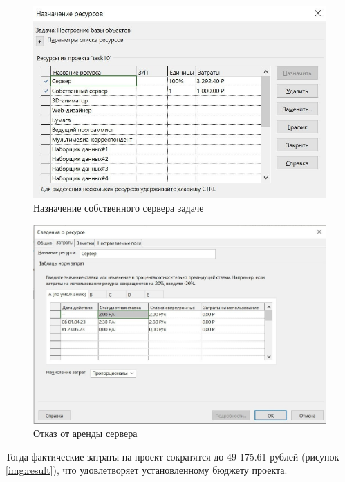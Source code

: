 \begin{figure}[H]
	\begin{center}
		\includegraphics[scale=0.3]{inc/img/alignment-server.jpg}
	\end{center}
	\captionsetup{justification=centering}
	\caption{Назначение собственного сервера задаче}
	\label{img:alignment-server}
\end{figure}

\begin{figure}[H]
	\begin{center}
		\includegraphics[scale=0.25]{inc/img/delete-server.jpg}
	\end{center}
	\captionsetup{justification=centering}
	\caption{Отказ от аренды сервера}
	\label{img:delete-server}
\end{figure}

Тогда фактические затраты на проект сократятся до 49 175.61 рублей (рисунок \ref{img:result}), что удовлетворяет установленному бюджету проекта.

